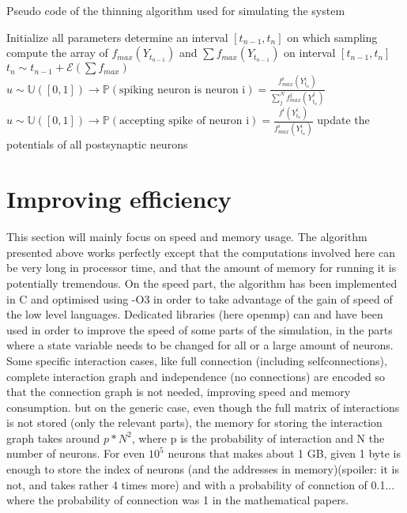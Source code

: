 	\begin{algorithm}
		\caption{Pseudo code of the thinning algorithm used for simulating the system}
		\label{alg:pseudo-code}
		\begin{algorithmic}
			\State Initialize all parameters
			\Repeat
				\Repeat
					\State determine an interval $[t_{n-1},t_n]$ on which sampling
					\State compute the array of $f_{max}(Y_{t_{n-1}})$ and $\sum f_{max}(Y_{t_{n-1}})$ on interval $[t_{n-1},t_n]$
					\State $t_n\sim t_{n-1}+\mathscr{E}(\sum f_{max})$
				$u\sim\mathbb{U}([0,1])\rightarrow \mathbb{P}(\text{spiking neuron is neuron i})=\frac{f_{max}^i(Y_{t_n}^i)}{\sum_j^N f_{max}^j(Y_{t_n}^j)}$
				$u\sim\mathbb{U}([0,1])\rightarrow \mathbb{P}(\text{accepting spike of neuron i})=\frac{f^i(Y_{t_n}^i)}{f_{max}^i(Y_{t_n}^i)}$
					update the potentials of all postsynaptic neurons
				\EndIf
		\end{algorithmic}
	\end{algorithm}

\section{Improving efficiency}
	This section will mainly focus on speed and memory usage. The algorithm presented above works perfectly except that the computations involved here can be very long in processor time, and that the amount of memory for running it is potentially tremendous. On the speed part, the algorithm has been implemented in C and optimised using -O3 in order to take advantage of the gain of speed of the low level languages. Dedicated libraries (here openmp) can and have been used in order to improve the speed of some parts of the simulation, in the parts where a state variable needs to be changed for all or a large amount of neurons.
	Some specific interaction cases, like full connection (including selfconnections), complete interaction graph and independence (no connections) are encoded so that the connection graph is not needed, improving speed and memory consumption. but on the generic case, even though the full matrix of interactions is not stored (only the relevant parts), the memory for storing the interaction graph takes around $p*N^2$, where p is the probability of interaction and N the number of neurons. For even $10^5$ neurons that makes about 1 GB, given 1 byte is enough to store the index of neurons (and the addresses in memory)(spoiler: it is not, and takes rather 4 times more) and with a probability of connction of 0.1... where the probability of connection was 1 in the mathematical papers.\\

